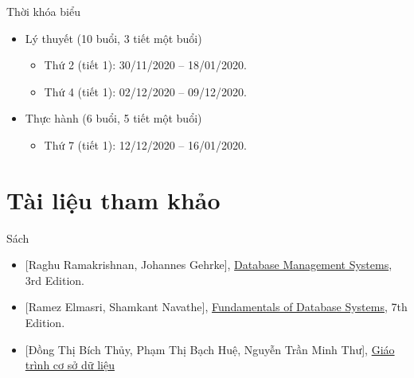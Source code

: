 \documentclass[11pt]{beamer}
\begin{document}
    \begin{frame}{Thời khóa biểu}
        \begin{itemize}
            \item Lý thuyết (10 buổi, 3 tiết một buổi)
            \begin{itemize}
                \item Thứ 2 (tiết 1): 30/11/2020 -- 18/01/2020.
                \item Thứ 4 (tiết 1): 02/12/2020 -- 09/12/2020.
            \end{itemize}
            \item Thực hành (6 buổi, 5 tiết một buổi)
            \begin{itemize}
                \item Thứ 7 (tiết 1): 12/12/2020 -- 16/01/2020.
            \end{itemize}
        \end{itemize}
    \end{frame}

    \section{Tài liệu tham khảo}
    \begin{frame}{Sách}
        \begin{itemize}
            \item {[Raghu Ramakrishnan, Johannes Gehrke]}, \href{http://pages.cs.wisc.edu/~dbbook/openAccess/thirdEdition/supporting_material.htm}{Database Management Systems}, 3rd Edition.
            \item {[Ramez Elmasri, Shamkant Navathe]}, \href{https://www.amazon.com/Fundamentals-Database-Systems-Ramez-Elmasri/dp/0133970779}{Fundamentals of Database Systems}, 7th Edition.
            \item {[Đồng Thị Bích Thủy, Phạm Thị Bạch Huệ, Nguyễn Trần Minh Thư]}, \href{http://nxbkhkt.com.vn/component/books/details/411}{Giáo trình cơ sở dữ liệu}
        \end{itemize}
    \end{frame}
\end{document}
